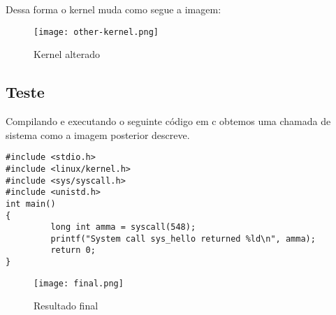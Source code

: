 \documentclass[a4paper, 12pt]{article}
\begin{document}
Dessa forma o kernel muda como segue a imagem:

\newpage

\begin{figure}[!h]
\centering 
\texttt{[image: other-kernel.png]}
\label{figura:qualquernome}
\caption{Kernel alterado}
\end{figure}

\subsection{Teste}

Compilando e executando o seguinte código em c obtemos uma chamada de sistema como a imagem posterior descreve.

\begin{lstlisting} 
#include <stdio.h>
#include <linux/kernel.h>
#include <sys/syscall.h>
#include <unistd.h>
int main()
{
         long int amma = syscall(548);
         printf("System call sys_hello returned %ld\n", amma);
         return 0;
}
\end{lstlisting}

\begin{figure}[!h]
\centering 
\texttt{[image: final.png]}
\label{figura:qualquernome}
\caption{Resultado final}
\end{figure}

\newpage
\end{document}
